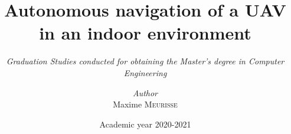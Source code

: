 \documentclass[a4paper, 12pt]{report}
\institute{\textbf{University of Liège}}
\title{Autonomous navigation of a UAV in an indoor environment}
\subtitle{\textit{Graduation Studies conducted for obtaining the Master's degree in Computer Engineering}}
\author{\textit{Author}\\Maxime \textsc{Meurisse}}
\date{Academic year 2020-2021}
\begin{document}
    
	\maketitle
	
	
	
	
	
	
	
	
	\tableofcontents
	
	
	
	
	
	
	
	
	
	
	
	
	\appendix
	
	
	
	
	\nocite{*}
	\printbibliography
\end{document}

